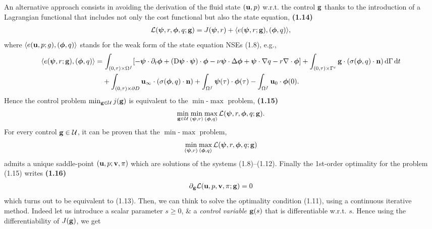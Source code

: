 \documentclass[oneside]{book}
\numberwithin{equation}{section}
\begin{document}
An alternative approach consists in avoiding the derivation of the fluid state $({\bf u},p)$ w.r.t. the control ${\bf g}$ thanks to the introduction of a Lagrangian functional that includes not only the cost functional but also the state equation, \textbf{(1.14)}
\begin{align*}
	\mathcal{L}(\boldsymbol{\psi},r,\boldsymbol{\phi},q;{\bf g}) = J(\boldsymbol{\psi},r) + \langle e(\boldsymbol{\psi},r;{\bf g}),(\boldsymbol{\phi},q)\rangle,
\end{align*}
where $\langle e({\bf u},p;g),(\boldsymbol{\phi},q)\rangle$ stands for the weak form of the state equation NSEs (1.8), e.g.,
\begin{align*}
	\langle e(\boldsymbol{\psi},r;{\bf g}),(\boldsymbol{\phi},q)\rangle =&\, \int_{(0,\tau)\times\Omega^f} [-\boldsymbol{\psi}\cdot\partial_t\boldsymbol{\phi} + ({\rm D}\boldsymbol{\psi}\cdot\boldsymbol{\psi})\cdot\boldsymbol{\phi} - \nu\boldsymbol{\psi}\cdot\Delta\boldsymbol{\phi} + \boldsymbol{\psi}\cdot\nabla q - r\nabla\cdot\boldsymbol{\phi}] + \int_{(0,\tau)\times\Gamma^c} {\bf g}\cdot(\sigma(\boldsymbol{\phi},q)\cdot{\bf n})\,{\rm d}\Gamma\,{\rm d}t\\
	&+ \int_{(0,\tau)\times\partial D} {\bf u}_\infty\cdot(\sigma(\boldsymbol{\phi},q)\cdot{\bf n}) + \int_{\Omega^f} \boldsymbol{\psi}(\tau)\cdot\boldsymbol{\phi}(\tau) - \int_{\Omega^f} {\bf u}_0\cdot\boldsymbol{\phi}(0).
\end{align*}
Hence the control problem $\min_{{\bf g}\in\mathcal{U}} j({\bf g})$ is equivalent to the $\min$-$\max$ problem, \textbf{(1.15)}
\begin{align*}
	\min_{{\bf g}\in\mathcal{U}}\min_{(\boldsymbol{\psi},r)}\max_{(\boldsymbol{\phi},q)} \mathcal{L}(\boldsymbol{\psi},r,\boldsymbol{\phi},q;{\bf g}).
\end{align*}
For every control ${\bf g}\in\mathcal{U}$, it can be proven that the $\min$-$\max$ problem,
\begin{align*}
	\min_{(\boldsymbol{\psi},r)}\max_{(\boldsymbol{\phi},q)} \mathcal{L}(\boldsymbol{\psi},r,\boldsymbol{\phi},q;{\bf g})
\end{align*}
admits a unique saddle-point $({\bf u},p;{\bf v},\pi)$ which are solutions of the systems (1.8)--(1.12). Finally the 1st-order optimality for the problem (1.15) writes \textbf{(1.16)}
\begin{align*}
	\partial_{\bf g}\mathcal{L}({\bf u},p,{\bf v},\pi;{\bf g}) = 0
\end{align*}
which turns out to be equivalent to (1.13). Then, we can think to solve the optimality condition (1.11), using a continuous iterative method. Indeed let us introduce a scalar parameter $s\ge 0$, \& a \textit{control variable} ${\bf g}(s)$ that is differentiable w.r.t. $s$. Hence using the differentiability of $J({\bf g})$, we get
\end{document}
